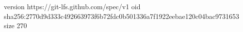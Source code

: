version https://git-lfs.github.com/spec/v1
oid sha256:2770d9d333c492663973f6b72fdc0b501336a7f1922eebae120c04bac9731653
size 270
